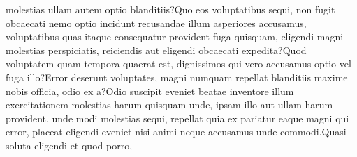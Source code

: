 \documentclass[letterpaper]{article} %
\begin{document}
molestias ullam autem optio blanditiis?Quo eos voluptatibus sequi, non fugit obcaecati nemo optio incidunt recusandae illum asperiores accusamus, voluptatibus quas itaque consequatur provident fuga quisquam, eligendi magni molestias perspiciatis, reiciendis aut eligendi obcaecati expedita?Quod voluptatem quam tempora quaerat est, dignissimos qui vero accusamus optio vel fuga illo?Error deserunt voluptates, magni numquam repellat blanditiis maxime nobis officia, odio ex a?Odio suscipit eveniet beatae inventore illum exercitationem molestias harum quisquam unde, ipsam illo aut ullam harum provident, unde modi molestias sequi, repellat quia ex pariatur eaque magni qui error, placeat eligendi eveniet nisi animi neque accusamus unde commodi.Quasi soluta eligendi et quod porro,

\end{document}
